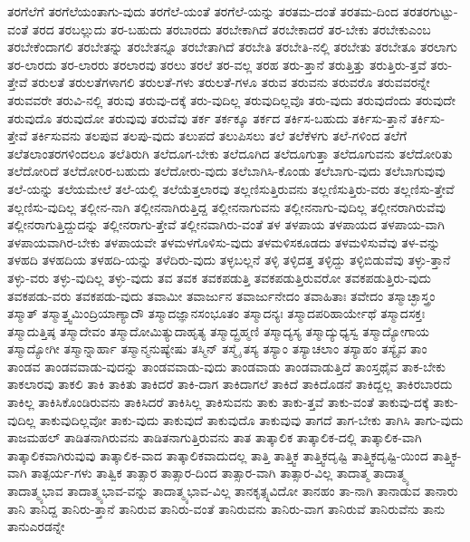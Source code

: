 {ತರಗೆಲೆಗೆ
ತರಗೆಲೆಯಂತಾಗು-ವುದು
ತರಗೆಲೆ-ಯಂತೆ
ತರಗೆಲೆ-ಯನ್ನು
ತರತಮ-ದಂತೆ
ತರತಮ-ದಿಂದ
ತರತರಗುಟ್ಟು-ವಂತೆ
ತರದ
ತರಬಲ್ಲುದು
ತರ-ಬಹುದು
ತರಬಾರದು
ತರಬೇಕಾಗಿದೆ
ತರಬೇಕಾದರೆ
ತರ-ಬೇಕು
ತರಬೇಕುಎಂಬ
ತರಬೇಕೆಂದಾಗಲಿ
ತರಬೇತನ್ನು
ತರಬೇತನ್ನೂ
ತರಬೇತಾಗಿದೆ
ತರಬೇತಿ
ತರಬೇತಿ-ನಲ್ಲಿ
ತರಬೇತು
ತರಬೇತೂ
ತರಲಾಗು
ತರ-ಲಾರದು
ತರ-ಲಾರರು
ತರಲಾರವು
ತರಲು
ತರಲೆ
ತರ-ವಲ್ಲ
ತರಹ
ತರು-ತ್ತಾನೆ
ತರುತ್ತಿತ್ತು
ತರುತ್ತಿರು-ತ್ತವೆ
ತರು-ತ್ತೇವೆ
ತರುಲತೆ
ತರುಲತೆಗಳಾಗಲಿ
ತರುಲತೆ-ಗಳು
ತರುಲತೆ-ಗಳೂ
ತರುವ
ತರುವನು
ತರುವರೊ
ತರುವವರನ್ನೇ
ತರುವವರೇ
ತರುವಿ-ನಲ್ಲಿ
ತರುವು
ತರುವು-ದಕ್ಕೆ
ತರು-ವುದಿಲ್ಲ
ತರುವುದಿಲ್ಲವೊ
ತರು-ವುದು
ತರುವುದೆಂದು
ತರುವುದೇ
ತರುವುದೊ
ತರುವುದೋ
ತರುವುವು
ತರುವೆವು
ತರ್ಕ
ತರ್ಕಕ್ಕೂ
ತರ್ಕದ
ತರ್ಕಿಸ-ಬಹುದು
ತರ್ಕಿಸು-ತ್ತಾನೆ
ತರ್ಕಿಸು-ತ್ತೇವೆ
ತರ್ಕಿಸುವನು
ತಲಪುವ
ತಲಪು-ವುದು
ತಲುಪದೆ
ತಲುಪಿಸಲು
ತಲೆ
ತಲೆಕೆಳಗು
ತಲೆ-ಗಳಿಂದ
ತಲೆಗೆ
ತಲೆತಲಾಂತರಗಳಿಂದಲೂ
ತಲೆತಿರುಗಿ
ತಲೆದೂಗ-ಬೇಕು
ತಲೆದೂಗಿದ
ತಲೆದೂಗುತ್ತಾ
ತಲೆದೂಗುವನು
ತಲೆದೋರಿತು
ತಲೆದೋರಿದೆ
ತಲೆದೋರಿರ-ಬಹುದು
ತಲೆದೋರು-ವುದು
ತಲೆಬಾಗಿಸಿ-ಕೊಂಡು
ತಲೆಬಾಗು-ವುದು
ತಲೆಬಾಗುವುವು
ತಲೆ-ಯನ್ನು
ತಲೆಯಮೇಲೆ
ತಲೆ-ಯಲ್ಲಿ
ತಲೆಯೆತ್ತಲಾರವು
ತಲ್ಲಣಿಸುತ್ತಿರುವನು
ತಲ್ಲಣಿಸುತ್ತಿರು-ವರು
ತಲ್ಲಣಿಸು-ತ್ತೇವೆ
ತಲ್ಲಣಿಸು-ವುದಿಲ್ಲ
ತಲ್ಲೀನ-ನಾಗಿ
ತಲ್ಲೀನನಾಗಿರುತ್ತಿದ್ದ
ತಲ್ಲೀನನಾಗುವನು
ತಲ್ಲೀನನಾಗು-ವುದಿಲ್ಲ
ತಲ್ಲೀನರಾಗಿರುವೆವು
ತಲ್ಲೀನರಾಗುತ್ತಿದ್ದುದನ್ನು
ತಲ್ಲೀನರಾಗು-ತ್ತೇವೆ
ತಲ್ಲೀನವಾಗಿರು-ವಂತೆ
ತಳ
ತಳಪಾಯ
ತಳಪಾಯದ
ತಳಪಾಯ-ವಾಗಿ
ತಳಪಾಯವಾಗಿರ-ಬೇಕು
ತಳಪಾಯವೇ
ತಳಮಳಗೊಳಿಸು-ವುದು
ತಳಮಳಿಸಕೂಡದು
ತಳಮಳಿಸುವೆವು
ತಳ-ವನ್ನು
ತಳಹದಿ
ತಳಹದಿಯ
ತಳಹದಿ-ಯನ್ನು
ತಳೆದಿರು-ವುದು
ತಳ್ಳಬಲ್ಲನೆ
ತಳ್ಳಿ
ತಳ್ಳಿದತ್ತ
ತಳ್ಳಿದ್ದು
ತಳ್ಳಿಬಿಡುವೆವು
ತಳ್ಳು-ತ್ತಾನೆ
ತಳ್ಳು-ವರು
ತಳ್ಳು-ವುದಿಲ್ಲ
ತಳ್ಳು-ವುದು
ತವ
ತವಕ
ತವಕಪಡುತ್ತಿ
ತವಕಪಡುತ್ತಿರುವರೋ
ತವಕಪಡುತ್ತಿರು-ವುದು
ತವಕಪಡು-ವರು
ತವಕಪಡು-ವುದು
ತವಾಮೀ
ತವಾರ್ಜುನ
ತವಾರ್ಜುನೇದಂ
ತವಾಹಿತಾಃ
ತವೇದಂ
ತಸ್ಮಾಚ್ಛಾಸ್ತ್ರಂ
ತಸ್ಮಾತ್
ತಸ್ಮಾತ್ತ್ವಮಿಂದ್ರಿಯಾಣ್ಯಾದೌ
ತಸ್ಮಾದಜ್ಞಾನಸಂಭೂತಂ
ತಸ್ಮಾದನ್ಯಃ
ತಸ್ಮಾದಪರಿಹಾರ್ಯೇಥೆ
ತಸ್ಮಾದಸಕ್ತಃ
ತಸ್ಮಾದುತ್ತಿಷ್ಠ
ತಸ್ಮಾದೇವಂ
ತಸ್ಮಾದೋಮಿತ್ಯುದಾಹೃತ್ಯ
ತಸ್ಮಾದ್ಬ್ರಹ್ಮಣಿ
ತಸ್ಮಾದ್ಯಸ್ಯ
ತಸ್ಮಾದ್ಯುಧ್ಯಸ್ವ
ತಸ್ಮಾದ್ಯೋಗಾಯ
ತಸ್ಮಾದ್ಯೋಗೀ
ತಸ್ಮಾನ್ನಾರ್ಹಾ
ತಸ್ಮಾನ್ಮನುಷ್ಯೇಷು
ತಸ್ಮಿನ್
ತಸ್ಮೈ
ತಸ್ಯ
ತಸ್ಯಾಂ
ತಸ್ಯಾಚಲಾಂ
ತಸ್ಯಾಹಂ
ತಸ್ಯೈವ
ತಾಂ
ತಾಂಡವ
ತಾಂಡವವಾಡು-ವುದನ್ನು
ತಾಂಡವವಾಡು-ವುದು
ತಾಂಡವಾಡು
ತಾಂಡವಾಡುತ್ತಿದೆ
ತಾಂಸ್ತಥೈವ
ತಾಕ-ಬೇಕು
ತಾಕಲಾರವು
ತಾಕಲಿ
ತಾಕಿ
ತಾಕಿತು
ತಾಕಿದರೆ
ತಾಕಿ-ದಾಗ
ತಾಕಿದಾಗಲೆ
ತಾಕಿದೆ
ತಾಕಿದೊಡನೆ
ತಾಕಿದ್ದಲ್ಲ
ತಾಕಿರಬಾರದು
ತಾಕಿಲ್ಲ
ತಾಕಿಸಿಕೊಂಡಿರುವನು
ತಾಕಿಸಿದರೆ
ತಾಕಿಸಿಲ್ಲ
ತಾಕಿಸುವನು
ತಾಕು
ತಾಕು-ತ್ತವೆ
ತಾಕು-ವಂತೆ
ತಾಕುವು-ದಕ್ಕೆ
ತಾಕು-ವುದಿಲ್ಲ
ತಾಕುವುದಿಲ್ಲವೋ
ತಾಕು-ವುದು
ತಾಕುವುದೆ
ತಾಕುವುದೊ
ತಾಕುವುವು
ತಾಗದೆ
ತಾಗ-ಬೇಕು
ತಾಗಿಸಿ
ತಾಗು-ವುದು
ತಾಜಮಹಲ್
ತಾಡಿತನಾಗಿರುವನು
ತಾಡಿತನಾಗುತ್ತಿರುವನು
ತಾತ
ತಾತ್ಕಾಲಿಕ
ತಾತ್ಕಾಲಿಕ-ದಲ್ಲಿ
ತಾತ್ಕಾಲಿಕ-ವಾಗಿ
ತಾತ್ಕಾಲಿಕವಾಗಿರುವುವು
ತಾತ್ಕಾಲಿಕ-ವಾದ
ತಾತ್ಕಾಲಿಕವಾದುದಲ್ಲ
ತಾತ್ತಿ
ತಾತ್ತ್ವಿಕ
ತಾತ್ತ್ವಿಕದೃಷ್ಟಿ
ತಾತ್ತ್ವಿಕದೃಷ್ಟಿ-ಯಿಂದ
ತಾತ್ತ್ವಿಕ-ವಾಗಿ
ತಾತ್ಪರ್ಯ-ಗಳು
ತಾತ್ವಿಕ
ತಾತ್ಸಾರ
ತಾತ್ಸಾರ-ದಿಂದ
ತಾತ್ಸಾರ-ವಾಗಿ
ತಾತ್ಸಾರ-ವಿಲ್ಲ
ತಾದಾತ್ಮ
ತಾದಾತ್ಮ್ಯ
ತಾದಾತ್ಮ್ಯಭಾವ
ತಾದಾತ್ಮ್ಯಭಾವ-ವನ್ನು
ತಾದಾತ್ಮ್ಯಭಾವ-ವಿಲ್ಲ
ತಾನಕೃತ್ಸ್ನವಿದೋ
ತಾನಹಂ
ತಾ-ನಾಗಿ
ತಾನಾಡುವ
ತಾನಾರು
ತಾನಿ
ತಾನಿದ್ದ
ತಾನಿರು-ತ್ತಾನೆ
ತಾನಿರುವ
ತಾನಿರು-ವಂತೆ
ತಾನಿರುವನು
ತಾನಿರು-ವಾಗ
ತಾನಿರುವೆ
ತಾನಿರುವೆನು
ತಾನು
ತಾನುಎರಡನ್ನೇ
}
